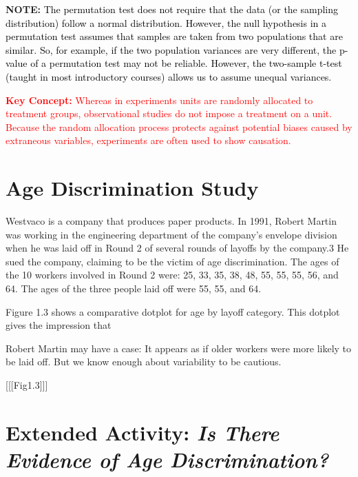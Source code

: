 \documentclass[
]{report}
\theoremstyle{definition}
\theoremstyle{definition}
\theoremstyle{definition}
\theoremstyle{definition}
\theoremstyle{remark}
\begin{document}
\large

\textbf{NOTE:}
\textcolor{black}{The permutation test does not require that the data (or the sampling distribution) follow a normal distribution.
However, the null hypothesis in a permutation test assumes that samples are taken from two populations
that are similar. So, for example, if the two population variances are very different, the p-value of a
permutation test may not be reliable. However, the two-sample t-test (taught in most introductory courses)
allows us to assume unequal variances.}

\Large

\textbf{\textcolor{red}{Key Concept:}}
\textcolor{red}{Whereas in experiments units are randomly allocated to treatment groups, observational studies do not
impose a treatment on a unit. Because the random allocation process protects against potential biases
caused by extraneous variables, experiments are often used to show causation.}

\hypertarget{age-discrimination-study}{%
\section*{Age Discrimination Study}\label{age-discrimination-study}}

\normalsize

Westvaco is a company that produces paper products. In 1991, Robert Martin was working in the engineering
department of the company's envelope division when he was laid off in Round 2 of several rounds of layoffs
by the company.3 He sued the company, claiming to be the victim of age discrimination. The ages of the 10
workers involved in Round 2 were: 25, 33, 35, 38, 48, 55, 55, 55, 56, and 64. The ages of the three people
laid off were 55, 55, and 64.

Figure 1.3 shows a comparative dotplot for age by layoff category. This dotplot gives the impression that

Robert Martin may have a case: It appears as if older workers were more likely to be laid off. But we know
enough about variability to be cautious.

{[}{[}{[}Fig1.3{]}{]}{]}

\hypertarget{extended-activity-is-there-evidence-of-age-discrimination}{%
\section*{\texorpdfstring{Extended Activity: \emph{Is There Evidence of Age Discrimination?}}{Extended Activity: Is There Evidence of Age Discrimination?}}\label{extended-activity-is-there-evidence-of-age-discrimination}}
\end{document}
